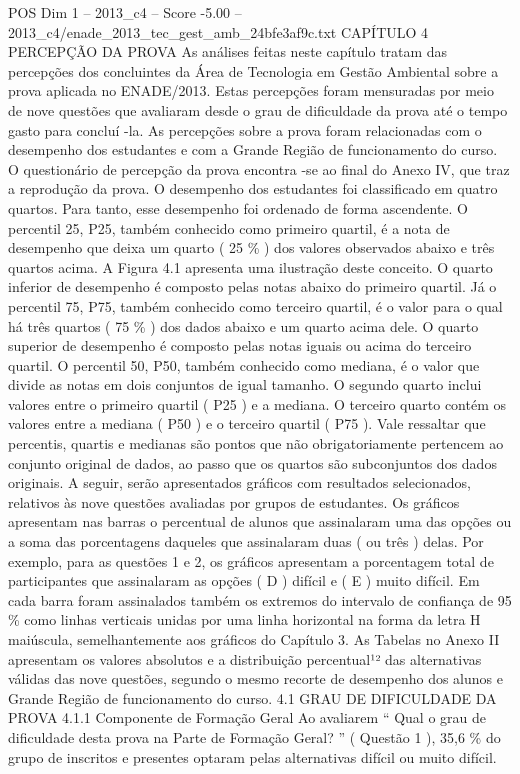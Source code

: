 \begin{textsample}{POS Dim 1 – 2013\_c4 – Score -5.00 – 2013\_c4/enade\_2013\_tec\_gest\_amb\_24bfe3af9c.txt}  \label{ex:f1_pos_387}
CAPÍTULO 4 PERCEPÇÃO DA PROVA As análises feitas neste capítulo tratam das percepções dos concluintes da Área de Tecnologia em Gestão Ambiental sobre a prova aplicada no ENADE/2013.
Estas percepções foram mensuradas por meio de nove questões que avaliaram desde o grau de dificuldade da prova até o tempo gasto para concluí -la.
As percepções sobre a prova foram relacionadas com o desempenho dos estudantes e com a Grande Região de funcionamento do curso.
O questionário de percepção da prova encontra -se ao final do Anexo IV, que traz a reprodução da prova.
O desempenho dos estudantes foi classificado em quatro quartos.
Para tanto, esse desempenho foi ordenado de forma ascendente.
O percentil 25, P25, também conhecido como primeiro quartil, é a nota de desempenho que deixa um quarto ( 25 \% ) dos valores observados abaixo e três quartos acima.
A Figura 4.1 apresenta uma ilustração deste conceito.
O quarto inferior de desempenho é composto pelas notas abaixo do primeiro quartil.
Já o percentil 75, P75, também conhecido como terceiro quartil, é o valor para o qual há três quartos ( 75 \% ) dos dados abaixo e um quarto acima dele.
O quarto superior de desempenho é composto pelas notas iguais ou acima do terceiro quartil.
O percentil 50, P50, também conhecido como mediana, é o valor que divide as notas em dois conjuntos de igual tamanho.
O segundo quarto inclui valores entre o primeiro quartil ( P25 ) e a mediana.
O terceiro quarto contém os valores entre a mediana ( P50 ) e o terceiro quartil ( P75 ).
Vale ressaltar que percentis, quartis e medianas são pontos que não obrigatoriamente pertencem ao conjunto original de dados, ao passo que os quartos são subconjuntos dos dados originais.
A seguir, serão apresentados gráficos com resultados selecionados, relativos às nove questões avaliadas por grupos de estudantes.
Os gráficos apresentam nas barras o percentual de alunos que assinalaram uma das opções ou a soma das porcentagens daqueles que assinalaram duas ( ou três ) delas.
Por exemplo, para as questões 1 e 2, os gráficos apresentam a porcentagem total de participantes que assinalaram as opções ( D ) difícil e ( E ) muito difícil.
Em cada barra foram assinalados também os extremos do intervalo de confiança de 95 \% como linhas verticais unidas por uma linha horizontal na forma da letra H maiúscula, semelhantemente aos gráficos do Capítulo 3.
As Tabelas no Anexo II apresentam os valores absolutos e a distribuição percentual¹² das alternativas válidas das nove questões, segundo o mesmo recorte de desempenho dos alunos e Grande Região de funcionamento do curso. 4.1 GRAU DE DIFICULDADE DA PROVA 4.1.1 Componente de Formação Geral Ao avaliarem “ Qual o grau de dificuldade desta prova na Parte de Formação Geral? ” ( Questão 1 ), 35,6 \% do grupo de inscritos e presentes optaram pelas alternativas difícil ou muito difícil.

\end{textsample}
